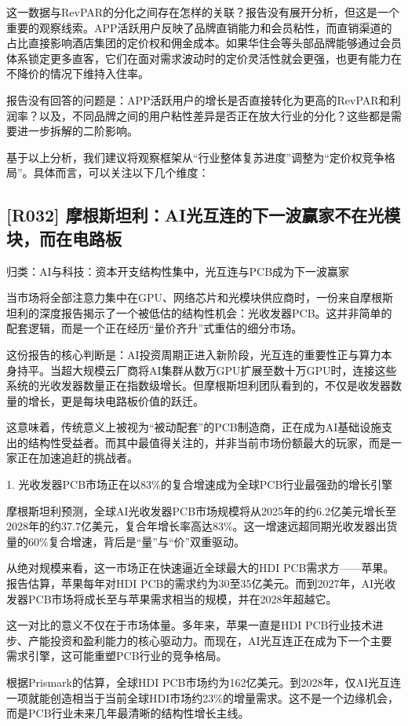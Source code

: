 \documentclass[11pt]{ctexart}
\begin{document}
这一数据与RevPAR的分化之间存在怎样的关联？报告没有展开分析，但这是一个重要的观察线索。APP活跃用户反映了品牌直销能力和会员粘性，而直销渠道的占比直接影响酒店集团的定价权和佣金成本。如果华住会等头部品牌能够通过会员体系锁定更多直客，它们在面对需求波动时的定价灵活性就会更强，也更有能力在不降价的情况下维持入住率。

报告没有回答的问题是：APP活跃用户的增长是否直接转化为更高的RevPAR和利润率？以及，不同品牌之间的用户粘性差异是否正在放大行业的分化？这些都是需要进一步拆解的二阶影响。

基于以上分析，我们建议将观察框架从“行业整体复苏进度”调整为“定价权竞争格局”。具体而言，可以关注以下几个维度：

\subsection{[R032] 摩根斯坦利：AI光互连的下一波赢家不在光模块，而在电路板}
{\small\color{refgray}归类：AI与科技：资本开支结构性集中，光互连与PCB成为下一波赢家}

当市场将全部注意力集中在GPU、网络芯片和光模块供应商时，一份来自摩根斯坦利的深度报告揭示了一个被低估的结构性机会：光收发器PCB。这并非简单的配套逻辑，而是一个正在经历“量价齐升”式重估的细分市场。

这份报告的核心判断是：AI投资周期正进入新阶段，光互连的重要性正与算力本身持平。当超大规模云厂商将AI集群从数万GPU扩展至数十万GPU时，连接这些系统的光收发器数量正在指数级增长。但摩根斯坦利团队看到的，不仅是收发器数量的增长，更是每块电路板价值的跃迁。

这意味着，传统意义上被视为“被动配套”的PCB制造商，正在成为AI基础设施支出的结构性受益者。而其中最值得关注的，并非当前市场份额最大的玩家，而是一家正在加速追赶的挑战者。

1. 光收发器PCB市场正在以83\%的复合增速成为全球PCB行业最强劲的增长引擎

摩根斯坦利预测，全球AI光收发器PCB市场规模将从2025年的约6.2亿美元增长至2028年的约37.7亿美元，复合年增长率高达83\%。这一增速远超同期光收发器出货量的60\%复合增速，背后是“量”与“价”双重驱动。

从绝对规模来看，这一市场正在快速逼近全球最大的HDI PCB需求方——苹果。报告估算，苹果每年对HDI PCB的需求约为30至35亿美元。而到2027年，AI光收发器PCB市场将成长至与苹果需求相当的规模，并在2028年超越它。

这一对比的意义不仅在于市场体量。多年来，苹果一直是HDI PCB行业技术进步、产能投资和盈利能力的核心驱动力。而现在，AI光互连正在成为下一个主要需求引擎，这可能重塑PCB行业的竞争格局。

根据Prismark的估算，全球HDI PCB市场约为162亿美元。到2028年，仅AI光互连一项就能创造相当于当前全球HDI市场约23\%的增量需求。这不是一个边缘机会，而是PCB行业未来几年最清晰的结构性增长主线。
\end{document}
